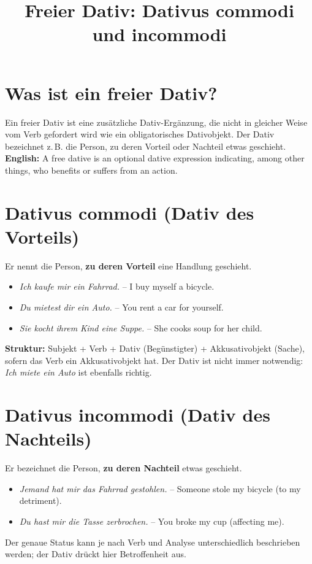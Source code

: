 \documentclass[a4paper,11pt]{article}
\title{Freier Dativ: Dativus commodi und incommodi}\date{}
\begin{document}
\maketitle\tableofcontents
\section{Was ist ein freier Dativ?}
Ein freier Dativ ist eine zusätzliche Dativ-Ergänzung, die nicht in gleicher Weise vom Verb gefordert wird wie ein obligatorisches Dativobjekt. Der Dativ bezeichnet z.\,B. die Person, zu deren Vorteil oder Nachteil etwas geschieht.
\textbf{English:} A free dative is an optional dative expression indicating, among other things, who benefits or suffers from an action.

\section{Dativus commodi (Dativ des Vorteils)}
Er nennt die Person, \textbf{zu deren Vorteil} eine Handlung geschieht.
\begin{itemize}
\item \textit{Ich kaufe mir ein Fahrrad.} -- I buy myself a bicycle.
\item \textit{Du mietest dir ein Auto.} -- You rent a car for yourself.
\item \textit{Sie kocht ihrem Kind eine Suppe.} -- She cooks soup for her child.
\end{itemize}
\textbf{Struktur:} Subjekt + Verb + Dativ (Begünstigter) + Akkusativobjekt (Sache), sofern das Verb ein Akkusativobjekt hat. Der Dativ ist nicht immer notwendig: \textit{Ich miete ein Auto} ist ebenfalls richtig.

\section{Dativus incommodi (Dativ des Nachteils)}
Er bezeichnet die Person, \textbf{zu deren Nachteil} etwas geschieht.
\begin{itemize}
\item \textit{Jemand hat mir das Fahrrad gestohlen.} -- Someone stole my bicycle (to my detriment).
\item \textit{Du hast mir die Tasse zerbrochen.} -- You broke my cup (affecting me).
\end{itemize}
Der genaue Status kann je nach Verb und Analyse unterschiedlich beschrieben werden; der Dativ drückt hier Betroffenheit aus.
\end{document}
